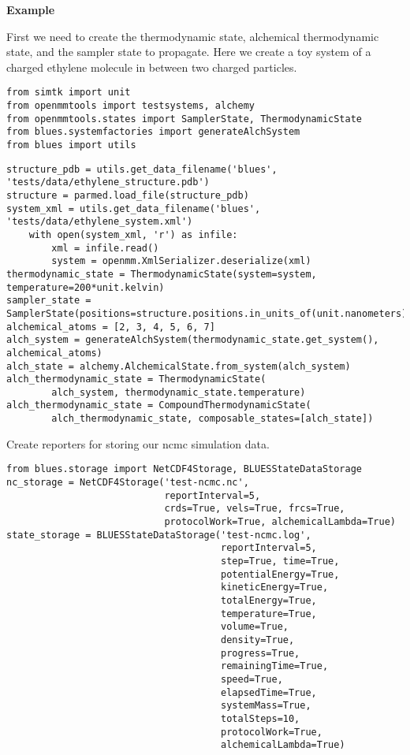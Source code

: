 \begin{description}
\item
    \textbf{Example}

First we need to create the thermodynamic state, alchemical
thermodynamic state, and the sampler state to propagate. Here we create
a toy system of a charged ethylene molecule in between two charged
particles.

\begin{verbatim}
from simtk import unit
from openmmtools import testsystems, alchemy
from openmmtools.states import SamplerState, ThermodynamicState
from blues.systemfactories import generateAlchSystem
from blues import utils
\end{verbatim}

\begin{verbatim}
structure_pdb = utils.get_data_filename('blues', 'tests/data/ethylene_structure.pdb')
structure = parmed.load_file(structure_pdb)
system_xml = utils.get_data_filename('blues', 'tests/data/ethylene_system.xml')
    with open(system_xml, 'r') as infile:
        xml = infile.read()
        system = openmm.XmlSerializer.deserialize(xml)
thermodynamic_state = ThermodynamicState(system=system, temperature=200*unit.kelvin)
sampler_state = SamplerState(positions=structure.positions.in_units_of(unit.nanometers))
alchemical_atoms = [2, 3, 4, 5, 6, 7]
alch_system = generateAlchSystem(thermodynamic_state.get_system(), alchemical_atoms)
alch_state = alchemy.AlchemicalState.from_system(alch_system)
alch_thermodynamic_state = ThermodynamicState(
        alch_system, thermodynamic_state.temperature)
alch_thermodynamic_state = CompoundThermodynamicState(
        alch_thermodynamic_state, composable_states=[alch_state])
\end{verbatim}

Create reporters for storing our ncmc simulation data.

\begin{verbatim}
from blues.storage import NetCDF4Storage, BLUESStateDataStorage
nc_storage = NetCDF4Storage('test-ncmc.nc',
                            reportInterval=5,
                            crds=True, vels=True, frcs=True,
                            protocolWork=True, alchemicalLambda=True)
state_storage = BLUESStateDataStorage('test-ncmc.log',
                                      reportInterval=5,
                                      step=True, time=True,
                                      potentialEnergy=True,
                                      kineticEnergy=True,
                                      totalEnergy=True,
                                      temperature=True,
                                      volume=True,
                                      density=True,
                                      progress=True,
                                      remainingTime=True,
                                      speed=True,
                                      elapsedTime=True,
                                      systemMass=True,
                                      totalSteps=10,
                                      protocolWork=True,
                                      alchemicalLambda=True)
\end{verbatim}


\end{description}
